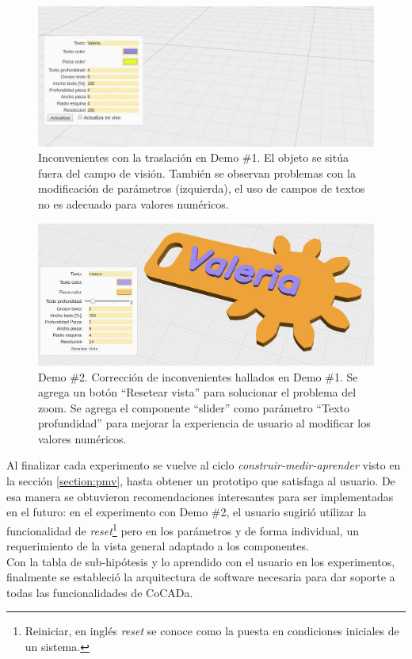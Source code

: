    \begin{figure}[h]
    \includegraphics[width=14cm]{Img/Desarrollo/feedback3.jpg}
    \centering
    \caption{\footnotesize{Inconvenientes con la traslación en Demo \#1. El objeto se sitúa fuera del campo de visión. También se observan problemas con la modificación de parámetros (izquierda), el uso de campos de textos no es adecuado para valores numéricos.}}
     \label{fig:feedback2}
    \end{figure}


\begin{figure}[ht]
    \includegraphics[width=14cm]{Img/Desarrollo/feedback4.jpg}
    \centering
    \caption{\footnotesize{Demo \#2. Corrección de inconvenientes hallados en Demo \#1. Se agrega un botón ``Resetear vista'' para solucionar el problema del zoom. Se agrega el componente ``slider'' como parámetro ``Texto profundidad'' para mejorar la experiencia de usuario al modificar los valores numéricos. }}
    \label{fig:feedback4}
\end{figure}

Al finalizar cada experimento se vuelve al ciclo \textit{construir-medir-aprender} visto en la sección \ref{section:pmv}, hasta obtener un prototipo que satisfaga al usuario. De esa manera se obtuvieron recomendaciones interesantes para ser implementadas en el futuro: en el experimento con Demo \#2, el usuario sugirió utilizar la funcionalidad de \textit{reset}\footnote{Reiniciar, en inglés \textit{reset} se conoce como la puesta en condiciones iniciales de un sistema.} pero en los parámetros y de forma individual, un requerimiento de la vista general adaptado a los componentes.\\
Con la tabla de sub-hipótesis y lo aprendido con el usuario en los experimentos, finalmente se estableció la arquitectura de software necesaria para dar soporte a todas las funcionalidades de CoCADa.

